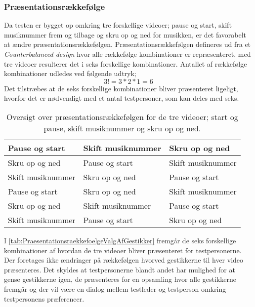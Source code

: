 \subsubsection{Præsentationsrækkefølge}
\label{PraesentationsraekkefoelgeValgAfGestikker}
%
Da testen er bygget op omkring tre forskellige videoer; pause og start, skift musiknummer frem og tilbage og skru op og ned for musikken, er det favorabelt at ændre præsentationsrækkefølgen. Præsentationsrækkefølgen defineres ud fra et \textit{Counterbalanced design} hvor alle rækkefølge kombinationer er repræsenteret, med tre videoer resulterer det i seks forskellige kombinationer. Antallet af rækkefølge kombinationer udledes ved følgende udtryk;
%
\begin{equation}
	3! = 3*2*1 = 6
\end{equation}
%
Det tilstræbes at de seks forskellige kombinationer bliver præsenteret ligeligt, hvorfor det er nødvendigt med et antal testpersoner, som kan deles med seks.
%
\begin{table}[H]
	\centering
	\begin{tabular}{ |  p{4cm}  |  p{4cm}  |  p{4cm}  |}
		\hline
		Pause og start & Skift musiknummer & Skru op og ned \\ \hline
		Skru op og ned & Pause og start & Skift musiknummer\\ \hline
		Skift musiknummer & Skru op og ned & Pause og start \\ \hline
		Pause og start & Skru op og ned & Skift musiknummer\\ \hline
		Skru op og ned & Skift musiknummer & Pause og start\\ \hline
		Skift musiknummer & Pause og start & Skru op og ned \\ \hline
	\end{tabular}
	\caption{Oversigt over præsentationsrækkefølgen for de tre videoer; start og pause, skift musiknummer og skru op og ned.}
	\label{tab:PraesentationsraekkefoelgeValgAfGestikker}
\end{table}
\noindent
%
I \autoref{tab:PraesentationsraekkefoelgeValgAfGestikker} fremgår de seks forskellige kombinationer af hvordan de tre videoer bliver præsenteret for testpersonerne. Der foretages ikke ændringer på rækkefølgen hvorved gestikkerne til hver video præsenteres. Det skyldes at testpersonerne blandt andet har mulighed for at gense gestikkerne igen, de præsenteres for en opsamling hvor alle gestikkerne fremgår og der vil være en dialog mellem testleder og testperson omkring testpersonens præferencer.  
%

